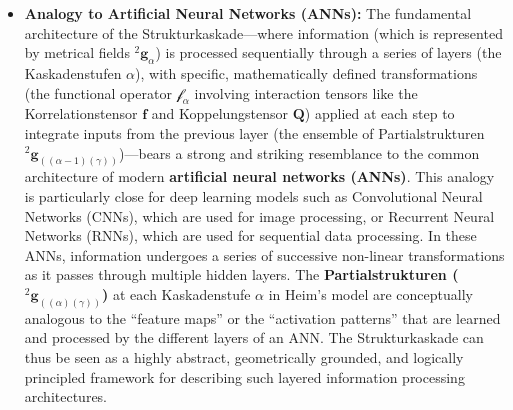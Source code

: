 \documentclass[12pt]{article}
\newcommand{\q}[1]{\enquote{#1}}
\newcommand{\kompositionsfeld}{{}^2\mathbf{g}}
\newcommand{\partialstruktur}[1]{{}^2\mathbf{g}_{(#1)}} %
\newcommand{\korrelationstensor}{\mathbf{f}}
\newcommand{\koppelungstensor}{\mathbf{Q}}
\newcommand{\kaskadenstufe}{\alpha}
\begin{document}
\begin{itemize}
    \item \textbf{Analogy to Artificial Neural Networks (ANNs):}
    The fundamental architecture of the Strukturkaskade—where information (which is represented by metrical fields \( \kompositionsfeld_\alpha \)) is processed sequentially through a series of layers (the Kaskadenstufen \( \kaskadenstufe \)), with specific, mathematically defined transformations (the functional operator \( \mathcal{f}_\alpha \) involving interaction tensors like the Korrelationstensor \( \korrelationstensor \) and Koppelungstensor \( \koppelungstensor \)) applied at each step to integrate inputs from the previous layer (the ensemble of Partialstrukturen \( \partialstruktur{(\alpha-1)(\gamma)} \))—bears a strong and striking resemblance to the common architecture of modern \textbf{artificial neural networks (ANNs)}. This analogy is particularly close for deep learning models such as Convolutional Neural Networks (CNNs), which are used for image processing, or Recurrent Neural Networks (RNNs), which are used for sequential data processing. In these ANNs, information undergoes a series of successive non-linear transformations as it passes through multiple hidden layers. The \textbf{Partialstrukturen (\( \partialstruktur{(\alpha)(\gamma)} \))} at each Kaskadenstufe \( \kaskadenstufe \) in Heim's model are conceptually analogous to the \q{feature maps} or the \q{activation patterns} that are learned and processed by the different layers of an ANN. The Strukturkaskade can thus be seen as a highly abstract, geometrically grounded, and logically principled framework for describing such layered information processing architectures.


\end{itemize}
\end{document}
